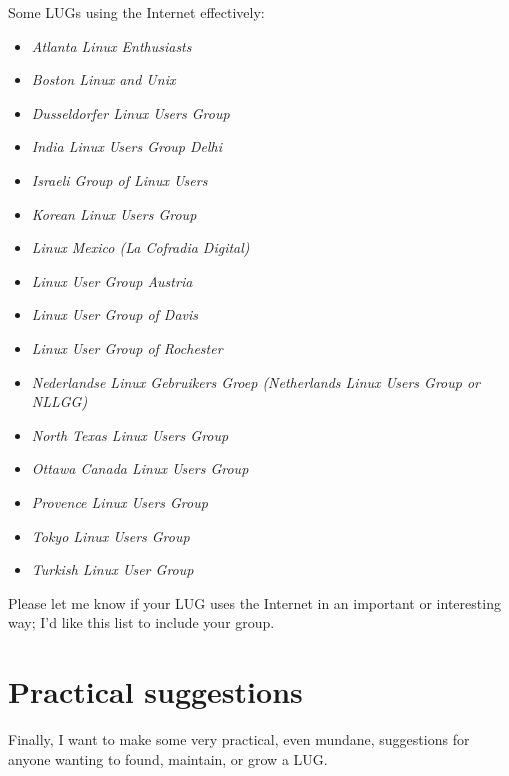 \documentclass{HOWTO}
\begin{document}
Some LUGs using the Internet effectively:

\begin{itemize}
\item 
\emph{Atlanta Linux Enthusiasts} \texttt{\advurl}
\item 
\emph{Boston Linux and Unix} \texttt{\adwurl}
\item 
\emph{Dusseldorfer Linux Users Group} \texttt{\adxurl}
\item 
\emph{India Linux Users Group Delhi} \texttt{\adyurl}
\item 
\emph{Israeli Group of Linux Users} \texttt{\adzurl}
\item 
\emph{Korean Linux Users Group} \texttt{\aeaurl}
\item 
\emph{Linux Mexico (La Cofradia Digital)} \texttt{\aeburl}
\item 
\emph{Linux User Group Austria} \texttt{\aecurl}
\item 
\emph{Linux User Group of Davis} \texttt{\aedurl}
\item 
\emph{Linux User Group of Rochester} \texttt{\aeeurl}
\item 
\emph{Nederlandse Linux Gebruikers Groep (Netherlands Linux Users Group or NLLGG)} \texttt{\aefurl}
\item 
\emph{North Texas Linux Users Group} \texttt{\aegurl}
\item 
\emph{Ottawa Canada Linux Users Group} \texttt{\aehurl}
\item 
\emph{Provence Linux Users Group} \texttt{\aeiurl}
\item 
\emph{Tokyo Linux Users Group} \texttt{\aejurl}
\item 
\emph{Turkish Linux User Group} \texttt{\aekurl}
\end{itemize}




Please let me know if your LUG uses the Internet in an important or
interesting way; I'd like this list to include your group.




\section{Practical suggestions}

Finally, I want to make some very practical, even mundane, suggestions
for anyone wanting to found, maintain, or grow a LUG.
\end{document}
